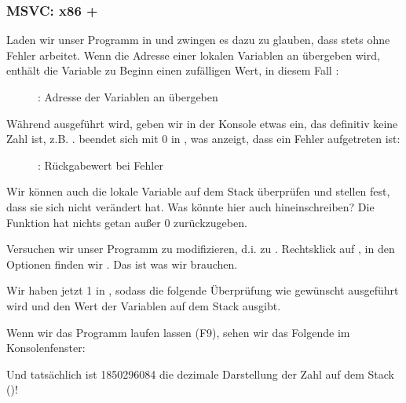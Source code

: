 \clearpage
\subsubsection{MSVC: x86 + \olly}
Laden wir unser Programm in \olly und zwingen es dazu zu glauben, dass \scanf stets ohne Fehler arbeitet.
Wenn die Adresse einer lokalen Variablen an \scanf übergeben wird, enthält die Variable zu Beginn einen zufälligen Wert,
in diesem Fall :

\begin{figure}[H]
\centering
{}
\caption{\olly: Adresse der Variablen an \scanf übergeben}
\label{fig:scanf_ex3_olly_1}
\end{figure}

\clearpage
Während \scanf ausgeführt wird, geben wir in der Konsole etwas ein, das definitiv keine Zahl ist, z.B. .
\scanf beendet sich mit 0 in \EAX, was anzeigt, dass ein Fehler aufgetreten ist:

\begin{figure}[H]
\centering
{}
\caption{\olly: \scanf Rückgabewert bei Fehler}
\label{fig:scanf_ex3_olly_2}
\end{figure}
Wir können auch die lokale Variable auf dem Stack überprüfen und stellen fest, dass sie sich nicht verändert hat.
Was könnte \scanf hier auch hineinschreiben? Die Funktion hat nichts getan außer 0 zurückzugeben.

Versuchen wir unser Programm zu modifizieren, d.i. zu .
Rechtsklick auf \EAX, in den Optionen finden wir . Das ist was wir brauchen.

Wir haben jetzt 1 in \EAX, sodass die folgende Überprüfung wie gewünscht ausgeführt wird und \printf den Wert der
Variablen auf dem Stack ausgibt.

Wenn wir das Programm laufen lassen (F9), sehen wir das Folgende im Konsolenfenster:



Und tatsächlich ist 1850296084 die dezimale Darstellung der Zahl auf dem Stack ()!
